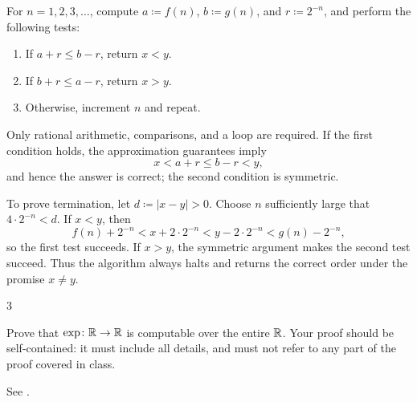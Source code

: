 \documentclass[11pt, oneside]{article}
\begin{document}
\begin{solution}
For $n=1, 2, 3, \ldots$, compute $a\coloneqq f(n)$,
$b\coloneqq g(n)$, and $r\coloneqq2^{-n}$, and perform the following tests:
\begin{enumerate}[label=(\arabic*), leftmargin=2.5em, topsep=4pt, itemsep=2pt]
    \item If $a+r\le b-r$, return $x<y$.
    \item If $b+r\le a-r$, return $x>y$.
    \item Otherwise, increment $n$ and repeat.
\end{enumerate}
Only rational arithmetic, comparisons, and a loop are required.
If the first condition holds, the approximation guarantees imply
\[
 x<a+r\le b-r<y,
\]
and hence the answer is correct; the second condition is symmetric.

To prove termination, let $d\coloneqq|x-y|>0$.
Choose $n$ sufficiently large that $4\cdot2^{-n}<d$.
If $x<y$, then
\[
 f(n)+2^{-n}<x+2\cdot2^{-n}
   <y-2\cdot2^{-n}<g(n)-2^{-n},
\]
so the first test succeeds. If $x>y$, the symmetric argument makes the
second test succeed. Thus the algorithm always halts and returns the
correct order under the promise $x\ne y$.
\end{solution}

\begin{problem}{3}
\begin{problemsubparts}
    \item Prove that $\exp\colon\mathbb{R}\to\mathbb{R}$ is computable over the entire
    $\mathbb{R}$. Your proof should be self-contained: it must include all details,
    and must not refer to any part of the proof covered in class.
    \item See .
\end{problemsubparts}
\end{problem}
\end{document}
